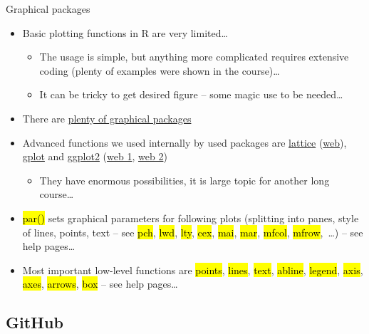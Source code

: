 \documentclass[compress, ucs, xelatex, 11pt, xcolor=svgnames,
  hyperref={
    bookmarks=true,
    unicode=true,
    colorlinks=true,
    pdftitle={Molecular data in R},
    plainpages=false,
    pdfauthor={Vojtech Zeisek},
    pdfsubject={Course about phylogeny and evolution in R},
    pdfcreator={XeLaTeX},
    pdfkeywords={R, evolution, phylogeny, molecular data},
    linkcolor=Tomato,
    anchorcolor=SaddleBrown,
    citecolor=Goldenrod,
    filecolor=DarkMagenta,
    menucolor=Sienna,
    urlcolor=DarkTurquoise,
    pdftex},
  url={hyphens, lowtilde} %
  ]{beamer}
\renewcommand{\texttt}[1]{\hl{\ttfamily #1}}
\begin{document}
\begin{frame}{Graphical packages}
  \begin{itemize}
    \item Basic plotting functions in R are very limited\ldots
    \begin{itemize}
      \item The usage is simple, but anything more complicated requires extensive coding (plenty of examples were shown in the course)\ldots
      \item It can be tricky to get desired figure -- some magic use to be needed\ldots
    \end{itemize}
    \item There are \href{https://cran.r-project.org/web/views/Graphics.html}{plenty of graphical packages}
    \item Advanced functions we used internally by used packages are \href{https://CRAN.R-project.org/package=lattice}{lattice} (\href{http://lattice.r-forge.r-project.org/}{web}), \href{https://CRAN.R-project.org/package=gplots}{gplot} and \href{https://CRAN.R-project.org/package=ggplot2}{ggplot2} (\href{http://ggplot2.org/}{web 1}, \href{http://ggplot2.tidyverse.org/}{web 2})
    \begin{itemize}
      \item They have enormous possibilities, it is large topic for another long course\ldots
    \end{itemize}
    \item \texttt{par()} sets graphical parameters for following plots (splitting into panes, style of lines, points, text -- see \texttt{pch}, \texttt{lwd}, \texttt{lty}, \texttt{cex}, \texttt{mai}, \texttt{mar}, \texttt{mfcol}, \texttt{mfrow},~\ldots) -- see help pages\ldots
    \item Most important low-level functions are \texttt{points}, \texttt{lines}, \texttt{text}, \texttt{abline}, \texttt{legend}, \texttt{axis}, \texttt{axes}, \texttt{arrows}, \texttt{box} -- see help pages\ldots
  \end{itemize}
\end{frame}

\subsection{GitHub}
\end{document}
